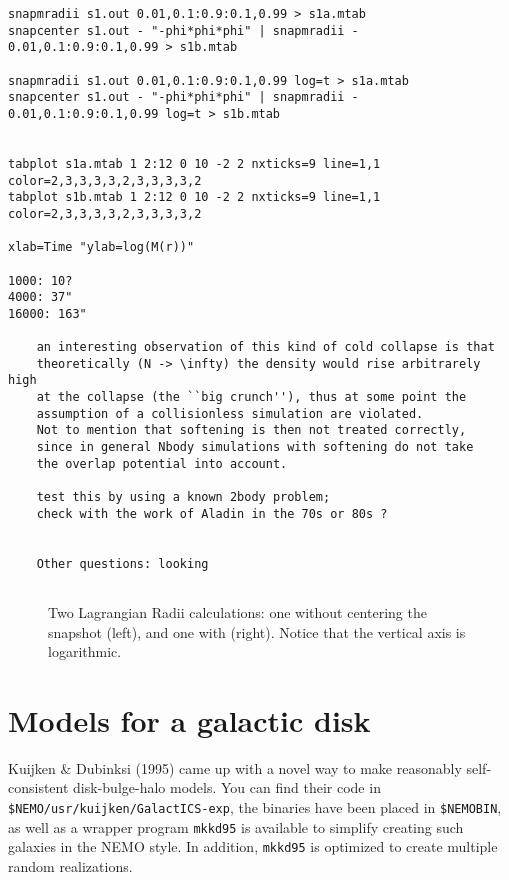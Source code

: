 \footnotesize\begin{verbatim}
snapmradii s1.out 0.01,0.1:0.9:0.1,0.99 > s1a.mtab
snapcenter s1.out - "-phi*phi*phi" | snapmradii - 0.01,0.1:0.9:0.1,0.99 > s1b.mtab

snapmradii s1.out 0.01,0.1:0.9:0.1,0.99 log=t > s1a.mtab
snapcenter s1.out - "-phi*phi*phi" | snapmradii - 0.01,0.1:0.9:0.1,0.99 log=t > s1b.mtab


tabplot s1a.mtab 1 2:12 0 10 -2 2 nxticks=9 line=1,1 color=2,3,3,3,3,2,3,3,3,3,2
tabplot s1b.mtab 1 2:12 0 10 -2 2 nxticks=9 line=1,1 color=2,3,3,3,3,2,3,3,3,3,2

xlab=Time "ylab=log(M(r))"

1000: 10?
4000: 37"
16000: 163"

    an interesting observation of this kind of cold collapse is that
    theoretically (N -> \infty) the density would rise arbitrarely high
    at the collapse (the ``big crunch''), thus at some point the
    assumption of a collisionless simulation are violated.
    Not to mention that softening is then not treated correctly,
    since in general Nbody simulations with softening do not take
    the overlap potential into account.

    test this by using a known 2body problem; 
    check with the work of Aladin in the 70s or 80s ?


    Other questions: looking


\end{verbatim}\normalsize

\begin{figure}[htb]
\caption[Lagrangian Radii for a Cold Collapse]
{Two Lagrangian Radii calculations: one without centering the
snapshot (left), and one with (right). Notice that the vertical axis is
logarithmic.}
\end{figure}




\section{Models for a galactic disk}

Kuijken \& Dubinksi (1995) came up with a novel way to make reasonably
self-consistent disk-bulge-halo models. You can find
their code in {\tt \$NEMO/usr/kuijken/GalactICS-exp}, the binaries have
been placed in {\tt \$NEMOBIN}, as well as a wrapper program
{\tt mkkd95} is available to simplify creating such galaxies in the
NEMO style. In addition, {\tt mkkd95} is optimized to create
multiple random realizations.

